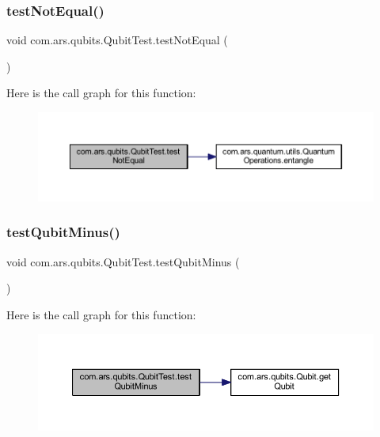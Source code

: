 \subsubsection{\texorpdfstring{test\+Not\+Equal()}{testNotEqual()}}
{\footnotesize\ttfamily void com.\+ars.\+qubits.\+Qubit\+Test.\+test\+Not\+Equal (\begin{DoxyParamCaption}{ }\end{DoxyParamCaption})}

Here is the call graph for this function\+:\nopagebreak
\begin{figure}[H]
\begin{center}
\leavevmode
\includegraphics[width=350pt]{classcom_1_1ars_1_1qubits_1_1_qubit_test_a399fda391bd4201af1d625d3beb8e1fd_cgraph}
\end{center}
\end{figure}
\hypertarget{classcom_1_1ars_1_1qubits_1_1_qubit_test_a911234a4c70ada90102877f163e3b973}{}\label{classcom_1_1ars_1_1qubits_1_1_qubit_test_a911234a4c70ada90102877f163e3b973} 
\subsubsection{\texorpdfstring{test\+Qubit\+Minus()}{testQubitMinus()}}
{\footnotesize\ttfamily void com.\+ars.\+qubits.\+Qubit\+Test.\+test\+Qubit\+Minus (\begin{DoxyParamCaption}{ }\end{DoxyParamCaption})}

Here is the call graph for this function\+:\nopagebreak
\begin{figure}[H]
\begin{center}
\leavevmode
\includegraphics[width=350pt]{classcom_1_1ars_1_1qubits_1_1_qubit_test_a911234a4c70ada90102877f163e3b973_cgraph}
\end{center}
\end{figure}
\hypertarget{classcom_1_1ars_1_1qubits_1_1_qubit_test_a2719401cc0f28a3c9676337dca71118d}{}\label{classcom_1_1ars_1_1qubits_1_1_qubit_test_a2719401cc0f28a3c9676337dca71118d} 
